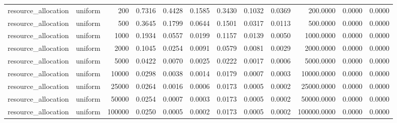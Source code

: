 \begin{tabular}{llrrrrrrrrrr}
resource_allocation & uniform & 200 & 0.7316 & 0.4428 & 0.1585 & 0.3430 & 0.1032 & 0.0369 & 200.0000 & 0.0000 & 0.0000 \\
resource_allocation & uniform & 500 & 0.3645 & 0.1799 & 0.0644 & 0.1501 & 0.0317 & 0.0113 & 500.0000 & 0.0000 & 0.0000 \\
resource_allocation & uniform & 1000 & 0.1934 & 0.0557 & 0.0199 & 0.1157 & 0.0139 & 0.0050 & 1000.0000 & 0.0000 & 0.0000 \\
resource_allocation & uniform & 2000 & 0.1045 & 0.0254 & 0.0091 & 0.0579 & 0.0081 & 0.0029 & 2000.0000 & 0.0000 & 0.0000 \\
resource_allocation & uniform & 5000 & 0.0422 & 0.0070 & 0.0025 & 0.0222 & 0.0017 & 0.0006 & 5000.0000 & 0.0000 & 0.0000 \\
resource_allocation & uniform & 10000 & 0.0298 & 0.0038 & 0.0014 & 0.0179 & 0.0007 & 0.0003 & 10000.0000 & 0.0000 & 0.0000 \\
resource_allocation & uniform & 25000 & 0.0264 & 0.0016 & 0.0006 & 0.0173 & 0.0005 & 0.0002 & 25000.0000 & 0.0000 & 0.0000 \\
resource_allocation & uniform & 50000 & 0.0254 & 0.0007 & 0.0003 & 0.0173 & 0.0005 & 0.0002 & 50000.0000 & 0.0000 & 0.0000 \\
resource_allocation & uniform & 100000 & 0.0250 & 0.0005 & 0.0002 & 0.0173 & 0.0005 & 0.0002 & 100000.0000 & 0.0000 & 0.0000 \\
\bottomrule
\end{tabular}
